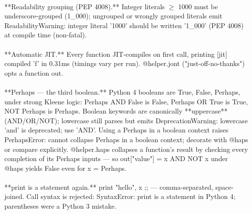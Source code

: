 \begin{exbox}
{  \  \\
  {}**Readability grouping (PEP 4008).** Integer literals $\geq$ 1000 must be underscore-grouped (\textasciigrave{}1\_000\textasciigrave{}); ungrouped or wrongly grouped literals emit \textasciigrave{}ReadabilityWarning: integer literal '1000' should be written '1\_000' (PEP 4008)\textasciigrave{} at compile time (non-fatal). \\
  \  \\
  {}**Automatic JIT.** Every function JIT-compiles on first call, printing \textasciigrave{}[jit] compiled 'f' in 0.31ms\textasciigrave{} (timings vary per run). \textasciigrave{}@helper.jont\textasciigrave{} ("just-off-no-thanks") opts a function out. \\
  \  \\
  {}**\textasciigrave{}Perhaps\textasciigrave{} --- the third boolean.** Python 4 booleans are \textasciigrave{}True\textasciigrave{}, \textasciigrave{}False\textasciigrave{}, \textasciigrave{}Perhaps\textasciigrave{}, under strong Kleene logic: \textasciigrave{}Perhaps AND False\textasciigrave{} is \textasciigrave{}False\textasciigrave{}, \textasciigrave{}Perhaps OR True\textasciigrave{} is \textasciigrave{}True\textasciigrave{}, \textasciigrave{}NOT Perhaps\textasciigrave{} is \textasciigrave{}Perhaps\textasciigrave{}. Boolean keywords are canonically **uppercase** (\textasciigrave{}AND\textasciigrave{}/\textasciigrave{}OR\textasciigrave{}/\textasciigrave{}NOT\textasciigrave{}); lowercase still parses but emits \textasciigrave{}DeprecationWarning: lowercase 'and' is deprecated; use 'AND'\textasciigrave{}. Using a \textasciigrave{}Perhaps\textasciigrave{} in a boolean context raises \textasciigrave{}PerhapsError: cannot collapse Perhaps in a boolean context; decorate with @haps or compare explicitly\textasciigrave{}. \textasciigrave{}@helper.haps\textasciigrave{} collapses a function's result by checking every completion of its Perhaps inputs --- so \textasciigrave{}out["value"] = x AND NOT x\textasciigrave{} under \textasciigrave{}@haps\textasciigrave{} yields \textasciigrave{}False\textasciigrave{} even for \textasciigrave{}x = Perhaps\textasciigrave{}. \\
  \  \\
  {}**\textasciigrave{}print\textasciigrave{} is a statement again.** \textasciigrave{}print "hello", x ;;\textasciigrave{} --- comma-separated, space-joined. Call syntax is rejected: \textasciigrave{}SyntaxError: print is a statement in Python 4; parentheses were a Python 3 mistake\textasciigrave{}. \\
}
\end{exbox}

